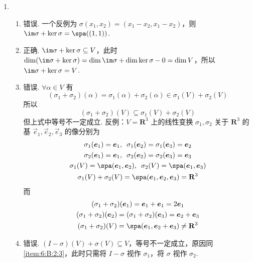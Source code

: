 \begin{enumerate}
\item \begin{enumerate}
        \item 错误. 一个反例为 $ \sigma(x_1, x_2) = (x_1 - x_2, x_1 - x_2) $，则 $ \im \sigma + \ker \sigma = \spa((1, 1)) $.

        \item 正确. $ \im \sigma + \ker \sigma \subseteq V $，此时 $ \dim(\im \sigma + \ker \sigma) = \dim \im \sigma + \dim \ker \sigma - 0 = \dim V $，所以 $ \im \sigma + \ker \sigma = V $.

        \item \label{item:6:B:2:3}
              错误. $ \forall \alpha \in V $ 有
              \[ (\sigma_1 + \sigma_2)(\alpha) = \sigma_1(\alpha) + \sigma_2(\alpha) \in \sigma_1(V) + \sigma_2(V) \]
              所以
              \[ (\sigma_1 + \sigma_2)(V) \subseteq \sigma_1(V) + \sigma_2(V) \]
              但上式中等号不一定成立. 反例：$ V = \mathbf{R}^3 $ 上的线性变换 $ \sigma_1, \sigma_2 $ 关于 $ \mathbf{R}^3 $ 的基 $ \vec{e}_1, \vec{e}_2, \vec{e}_3 $ 的像分别为
              \begin{gather*}
                  \sigma_1(\vec{e}_1) = \vec{e}_1,\enspace \sigma_1(\vec{e}_2) = \sigma_1(\vec{e}_3) = \vec{e}_2 \\
                  \sigma_2(\vec{e}_1) = \vec{e}_1,\enspace \sigma_2(\vec{e}_2) = \sigma_2(\vec{e}_3) = \vec{e}_3 \\
                  \sigma_1(V) = \spa(\vec{e}_1, \vec{e}_2),\enspace \sigma_2(V) = \spa(\vec{e}_1, \vec{e}_3) \\
                  \sigma_1(V) + \sigma_2(V) = \spa(\vec{e}_1, \vec{e}_2, \vec{e}_3) = \mathbf{R}^3
              \end{gather*}
              而
              \begin{gather*}
                  (\sigma_1 + \sigma_2)(\vec{e}_1) = \vec{e}_1 + \vec{e}_1 = 2 \vec{e}_1 \\
                  (\sigma_1 + \sigma_2)(\vec{e}_2) = (\sigma_1 + \sigma_2)(\vec{e}_3) = \vec{e}_2 + \vec{e}_3 \\
                  (\sigma_1 + \sigma_2)(V) = \spa(\vec{e}_1, \vec{e}_2 + \vec{e}_3) \neq \mathbf{R}^3
              \end{gather*}

        \item 错误. $ (I - \sigma)(V) + \sigma(V) \subseteq V $，等号不一定成立，原因同 \ref*{item:6:B:2:3}，此时只需将 $ I - \sigma $ 视作 $ \sigma_1 $，将 $ \sigma $ 视作 $ \sigma_2 $.
    \end{enumerate}


\end{enumerate}
